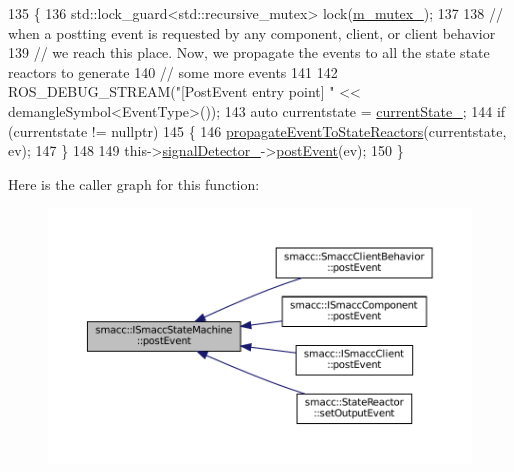 \begin{DoxyCode}
135 \{
136     std::lock\_guard<std::recursive\_mutex> lock(\hyperlink{classsmacc_1_1ISmaccStateMachine_aac785541646e5c517273bf31072505a1}{m\_mutex\_});
137 
138     \textcolor{comment}{// when a postting event is requested by any component, client, or client behavior}
139     \textcolor{comment}{// we reach this place. Now, we propagate the events to all the state state reactors to generate}
140     \textcolor{comment}{// some more events}
141 
142     ROS\_DEBUG\_STREAM(\textcolor{stringliteral}{"[PostEvent entry point] "} << demangleSymbol<EventType>());
143     \textcolor{keyword}{auto} currentstate = \hyperlink{classsmacc_1_1ISmaccStateMachine_a9c6e7745205bcce80a301f2fbe8f7e99}{currentState\_};
144     \textcolor{keywordflow}{if} (currentstate != \textcolor{keyword}{nullptr})
145     \{
146         \hyperlink{classsmacc_1_1ISmaccStateMachine_a3d369c7cff22632ca85a8656000ba19c}{propagateEventToStateReactors}(currentstate, ev);
147     \}
148 
149     this->\hyperlink{classsmacc_1_1ISmaccStateMachine_a3982eb671f5f001cb047d3a467789986}{signalDetector\_}->\hyperlink{classsmacc_1_1SignalDetector_a6ab99d99cef8d101e39797a72daeb2b7}{postEvent}(ev);
150 \}
\end{DoxyCode}
Here is the caller graph for this function\+:
\nopagebreak
\begin{figure}[H]
\begin{center}
\leavevmode
\includegraphics[width=350pt]{classsmacc_1_1ISmaccStateMachine_ad80cdd7bbc9a9f3b221c625754fed1ed_icgraph}
\end{center}
\end{figure}
\mbox{\label{classsmacc_1_1ISmaccStateMachine_a1549189caf29520514e677ca46f57348}} 
